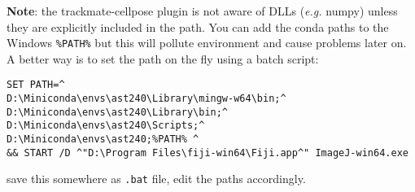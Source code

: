 \documentclass[11pt]{article}
\begin{document}
\textbf{Note}: the trackmate-cellpose plugin is not aware of DLLs (\emph{e.g.} numpy) unless they are explicitly included in the path. You can add the conda paths to the Windows \texttt{\%PATH\%} but this will pollute environment and cause problems later on. A better way is to set the path on the fly using a batch script: 
\begin{verbatim}
SET PATH=^
D:\Miniconda\envs\ast240\Library\mingw-w64\bin;^
D:\Miniconda\envs\ast240\Library\bin;^
D:\Miniconda\envs\ast240\Scripts;^
D:\Miniconda\envs\ast240;%PATH% ^
&& START /D ^"D:\Program Files\fiji-win64\Fiji.app^" ImageJ-win64.exe
\end{verbatim}
save this somewhere as \texttt{.bat} file, edit the paths accordingly.
\end{document}
